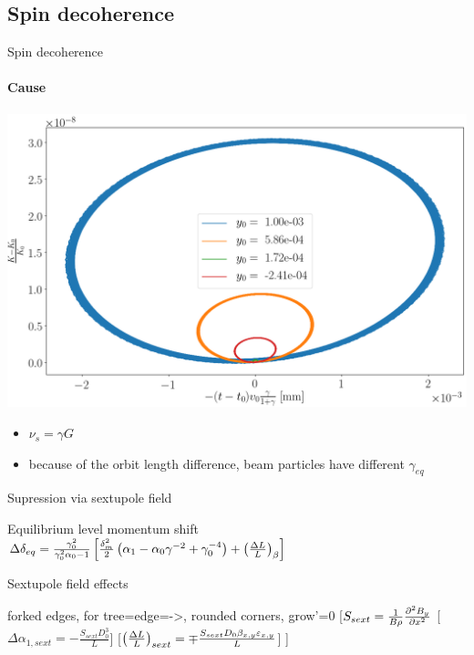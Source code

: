 \documentclass[14pt]{beamer}
\begin{document}
\subsection{Spin decoherence}
\begin{frame}{Spin decoherence}
	\framesubtitle{Cause}
	\begin{minipage}{.65\linewidth}
		\includegraphics[width=\linewidth]{chapter1/psp_diagram_betatron}
	\end{minipage}%
	\begin{minipage}{.4\linewidth}
		\begin{itemize}
			\item $\nu_s = \gamma G$
			\item because of the orbit length difference, beam particles have different $\gamma_{eq}$ 
		\end{itemize}
	\end{minipage}
\end{frame}
\begin{frame}{Supression via sextupole field}
	\begin{block}{Equilibrium level momentum shift}
		$\Delta\delta_{eq} = \frac{\gamma_0^2}{\gamma_0^2\alpha_0 - 1}\bkt*{\frac{\delta_m^2}{2}\bkt{\alpha_1 - \alpha_0\gamma^{-2} + \gamma_0^{-4}} + \bkt{\frac{\Delta L}{L}}_\beta}$
	\end{block}
	\begin{block}{Sextupole field effects}
		\begin{forest}
			forked edges,
			for tree={edge={->},  rounded corners, grow'=0}
			[{$S_{sext} = \frac{1}{B\rho} \pddx{B_y}[x][2]$}
			[{$\Delta \alpha_{1,sext} = -\frac{S_{sext}D_0^3}{L}$}]
			[{$\bkt{\frac{\Delta L}{L}}_{sext} = \mp \frac{S_{sext}D_0\beta_{x,y}\varepsilon_{x,y}}{L}$}]
			]
		\end{forest}
	\end{block}
\end{frame}
\end{document}
